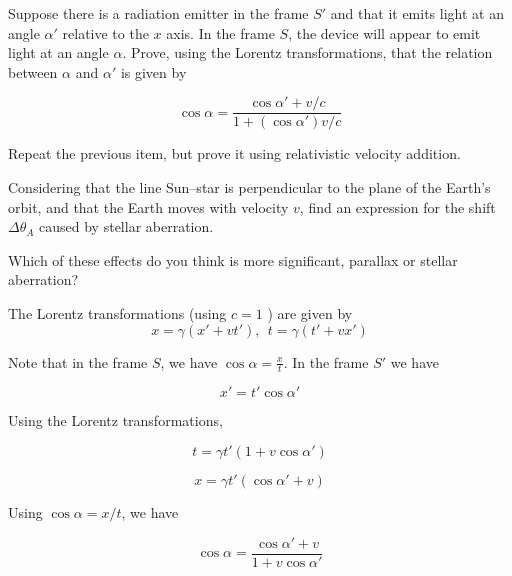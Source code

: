 \documentclass[11pt]{article}
\begin{document}
\begin{pproblem}
\begin{alternativas}
        \item Suppose there is a radiation emitter in the frame \(S'\) and that it emits light at an angle \(\alpha'\) relative to the \(x\) axis. In the frame \(S\), the device will appear to emit light at an angle \(\alpha\). Prove, using the Lorentz transformations, that the relation between \(\alpha\) and \(\alpha'\) is given by
        
        \[\cos\alpha = \frac{\cos\alpha' + v/c}{1+(\cos\alpha') v/c}\]

        \item Repeat the previous item, but prove it using relativistic velocity addition.

        \item Considering that the line Sun--star is perpendicular to the plane of the Earth's orbit, and that the Earth moves with velocity \(v\), find an expression for the shift \(\Delta\theta_A\) caused by stellar aberration.
    
        \item Which of these effects do you think is more significant, parallax or stellar aberration?
    \end{alternativas}

    \begin{pssolution*}{}{}
        \begin{alternativas}
            \item %
            
            \item %
                
            \item The Lorentz transformations (using \(c=1\) ) are given by
            \[x = \gamma (x' + vt'), \ \ t = \gamma(t' + vx')\]

            \item Note that in the frame \(S\), we have \(\cos \alpha = \frac{x}{t}\). In the frame \(S'\) we have
            
            \[x' = t'\cos\alpha'\]

            Using the Lorentz transformations,

            \[t = \gamma t'(1+v\cos\alpha') \]

            \[x = \gamma t'(\cos\alpha'+ v)\]

            Using \(\cos\alpha = x/t\), we have

            \[\cos\alpha = \frac{\cos\alpha' + v}{1+ v\cos\alpha'}\]


\end{alternativas}
\end{pssolution*}
\end{pproblem}
\end{document}
